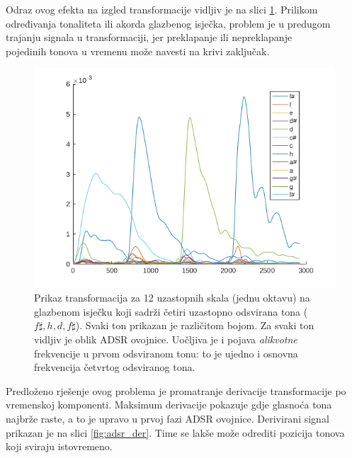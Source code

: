 \documentclass[a4paper, 10pt, twocolumn]{article}
\begin{document}
Odraz ovog efekta na izgled transformacije vidljiv je na slici \ref{fig:adsr_anomalija}.
Prilikom određivanja tonaliteta ili akorda glazbenog isječka, problem je u predugom trajanju signala u transformaciji, jer preklapanje ili nepreklapanje \\
pojedinih tonova u vremenu može navesti na krivi zaključak.

\begin{figure}[htb]
  \includegraphics[width=\linewidth]{adsr_anomalija}
  \caption{Prikaz transformacija za 12 uzastopnih skala (jednu oktavu) na glazbenom isječku koji sadrži četiri uzastopno odsvirana tona ($f\sharp, h, d, f\sharp$). Svaki ton prikazan je različitom bojom. Za svaki ton vidljiv je oblik ADSR ovojnice. Uočljiva je i pojava \textit{alikvotne} frekvencije u prvom odsviranom tonu: to je ujedno i osnovna frekvencija četvrtog odsviranog tona.}
  \label{fig:adsr_anomalija}
\end{figure}

Predloženo rješenje ovog problema je promatranje derivacije transformacije po vremenskoj komponenti.
Maksimum derivacije pokazuje gdje glasnoća tona najbrže raste, a to je upravo u prvoj fazi ADSR ovojnice.
Derivirani signal prikazan je na slici \ref{fig:adsr_der}.
Time se lakše može odrediti pozicija tonova koji sviraju istovremeno.
\end{document}
